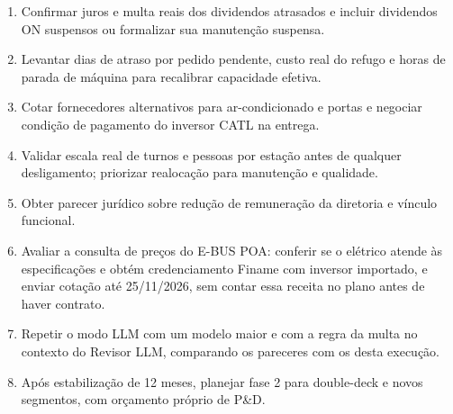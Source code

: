 \documentclass[12pt,a4paper,oneside,brazil]{abntex2}
\begin{document}
\begin{enumerate}
\item Confirmar juros e multa reais dos dividendos atrasados e incluir dividendos ON suspensos ou formalizar sua manutenção suspensa.
\item Levantar dias de atraso por pedido pendente, custo real do refugo e horas de parada de máquina para recalibrar capacidade efetiva.
\item Cotar fornecedores alternativos para ar-condicionado e portas e negociar condição de pagamento do inversor CATL na entrega.
\item Validar escala real de turnos e pessoas por estação antes de qualquer desligamento; priorizar realocação para manutenção e qualidade.
\item Obter parecer jurídico sobre redução de remuneração da diretoria e vínculo funcional.
\item Avaliar a consulta de preços do E-BUS POA: conferir se o elétrico atende às especificações e obtém credenciamento Finame com inversor importado, e enviar cotação até 25/11/2026, sem contar essa receita no plano antes de haver contrato.
\item Repetir o modo LLM com um modelo maior e com a regra da multa no contexto do Revisor LLM, comparando os pareceres com os desta execução.
\item Após estabilização de 12 meses, planejar fase 2 para double-deck e novos segmentos, com orçamento próprio de P\&D.
\end{enumerate}

\postextual

\end{document}
